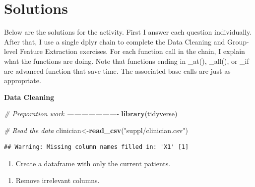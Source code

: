 \documentclass[]{book}
\newenvironment{Shaded}{\begin{snugshade}}{\end{snugshade}}
\newcommand{\CommentTok}[1]{\textcolor[rgb]{0.56,0.35,0.01}{\textit{#1}}}
\newcommand{\DecValTok}[1]{\textcolor[rgb]{0.00,0.00,0.81}{#1}}
\newcommand{\KeywordTok}[1]{\textcolor[rgb]{0.13,0.29,0.53}{\textbf{#1}}}
\newcommand{\NormalTok}[1]{#1}
\newcommand{\OperatorTok}[1]{\textcolor[rgb]{0.81,0.36,0.00}{\textbf{#1}}}
\newcommand{\StringTok}[1]{\textcolor[rgb]{0.31,0.60,0.02}{#1}}
\providecommand{\tightlist}{%
  \setlength{\itemsep}{0pt}\setlength{\parskip}{0pt}}
\theoremstyle{definition}
\theoremstyle{definition}
\theoremstyle{definition}
\theoremstyle{remark}
\begin{document}
\hypertarget{solutions}{%
\section{Solutions}\label{solutions}}

Below are the solutions for the activity. First I answer each question individually. After that, I use a single dplyr chain to complete the Data Cleaning and Group-level Feature Extraction exercises. For each function call in the chain, I explain what the functions are doing. Note that functions ending in \_at(), \_all(), or \_if are advanced function that save time. The associated base calls are just as appropriate.

\textbf{Data Cleaning}

\begin{Shaded}
\begin{Highlighting}[]
\CommentTok{# Preporation work ----------------------}
\KeywordTok{library}\NormalTok{(tidyverse)}

\CommentTok{# Read the data}
\NormalTok{clinician<-}\KeywordTok{read_csv}\NormalTok{(}\StringTok{"suppl/clinician.csv"}\NormalTok{)}
\end{Highlighting}
\end{Shaded}

\begin{verbatim}
## Warning: Missing column names filled in: 'X1' [1]
\end{verbatim}

\begin{enumerate}
\def\labelenumi{\arabic{enumi}.}
\tightlist
\item
  Create a dataframe with only the current patients.
\end{enumerate}

\begin{Shaded}
\end{Shaded}

\begin{enumerate}
\def\labelenumi{\arabic{enumi}.}
\setcounter{enumi}{1}
\tightlist
\item
  Remove irrelevant columns.
\end{enumerate}
\end{document}
